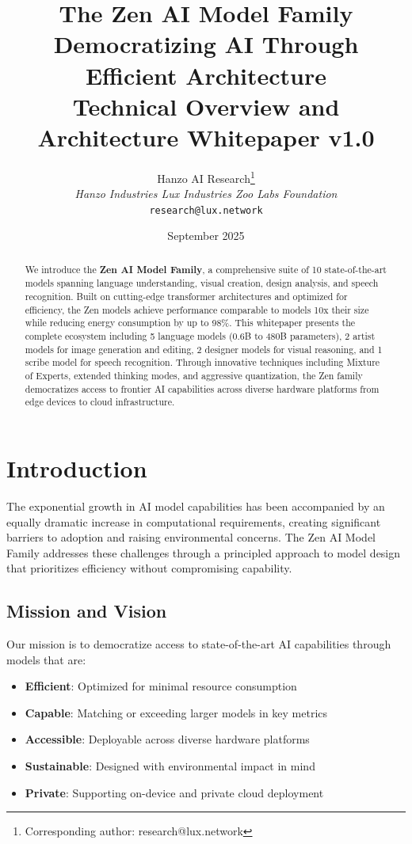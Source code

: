 \documentclass[11pt,a4paper]{article}
\title{
    \vspace{-2cm}
    \Huge \textbf{The Zen AI Model Family} \\
    \vspace{0.5cm}
    \Large Democratizing AI Through Efficient Architecture \\
    \vspace{0.3cm}
    \normalsize Technical Overview and Architecture Whitepaper v1.0
}
\author{
    Hanzo AI Research\thanks{Corresponding author: research@lux.network} \\
    \textit{Hanzo Industries \quad Lux Industries \quad Zoo Labs Foundation} \\
    \texttt{research@lux.network}
}
\date{September 2025}
\begin{document}
\maketitle

\begin{abstract}
We introduce the \textbf{Zen AI Model Family}, a comprehensive suite of 10 state-of-the-art models spanning language understanding, 
visual creation, design analysis, and speech recognition. Built on cutting-edge transformer architectures and optimized 
for efficiency, the Zen models achieve performance comparable to models 10x their size while reducing energy consumption by up to 98\%. 
This whitepaper presents the complete ecosystem including 5 language models (0.6B to 480B parameters), 2 artist models for image 
generation and editing, 2 designer models for visual reasoning, and 1 scribe model for speech recognition. Through innovative 
techniques including Mixture of Experts, extended thinking modes, and aggressive quantization, the Zen family democratizes 
access to frontier AI capabilities across diverse hardware platforms from edge devices to cloud infrastructure.
\end{abstract}

\tableofcontents
\newpage

\section{Introduction}

The exponential growth in AI model capabilities has been accompanied by an equally dramatic increase in computational requirements, 
creating significant barriers to adoption and raising environmental concerns. The Zen AI Model Family addresses these challenges 
through a principled approach to model design that prioritizes efficiency without compromising capability.

\subsection{Mission and Vision}

Our mission is to democratize access to state-of-the-art AI capabilities through models that are:
\begin{itemize}
    \item \textbf{Efficient}: Optimized for minimal resource consumption
    \item \textbf{Capable}: Matching or exceeding larger models in key metrics
    \item \textbf{Accessible}: Deployable across diverse hardware platforms
    \item \textbf{Sustainable}: Designed with environmental impact in mind
    \item \textbf{Private}: Supporting on-device and private cloud deployment
\end{itemize}
\end{document}

